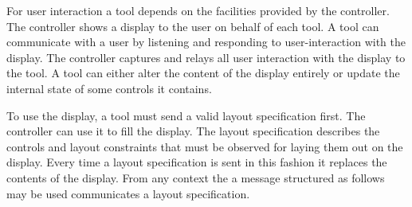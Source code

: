 \documentclass{article}
\begin{document}
   For user interaction a tool depends on the facilities provided by the
   controller. The controller shows a display to the user on behalf of each
   tool.  A tool can communicate with a user by listening and responding to
   user-interaction with the display. The controller captures and relays all
   user interaction with the display to the tool. A tool can either alter the
   content of the display entirely or update the internal state of some
   controls it contains.

   To use the display, a tool must send a valid layout specification first.
   The controller can use it to fill the display. The layout specification
   describes the controls and layout constraints that must be observed for
   laying them out on the display. Every time a layout specification is sent in
   this fashion it replaces the contents of the display. From any context the
   a message structured as follows may be used communicates a layout specification.
   
\end{document}
